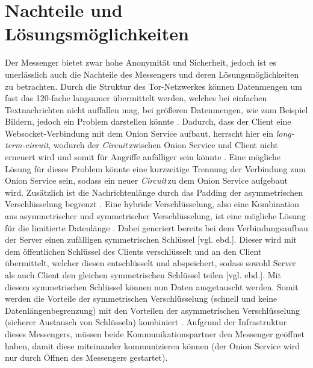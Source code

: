 \documentclass[a4paper,ngerman, headheight=28pt,12pt, footheight=27pt]{scrartcl}
\newcommand{\vcite}[1]{\cite[vgl.][]{#1}}
\newcommand{\vebd}{[vgl. ebd.]}
\newcommand{\circuit}{\textit{Circuit\,}}
\begin{document}
\section{Nachteile und Lösungsmöglichkeiten}
Der Messenger bietet zwar hohe Anonymität und Sicherheit, jedoch ist es unerlässlich auch die Nachteile des Messengers und deren Lösungsmöglichkeiten zu betrachten. Durch die Struktur des Tor-Netzwerkes können Datenmengen um fast das 120-fache langsamer übermittelt werden, welches bei einfachen Textnachrichten nicht auffallen mag, bei größeren Datenmengen, wie zum Beispiel Bildern, jedoch ein Problem darstellen könnte \vcite{TorPerformance}.
Dadurch, dass der Client eine Websocket-Verbindung mit dem Onion Service aufbaut, herrscht hier ein \textit{long-term-circuit}, wodurch der \circuit zwischen Onion Service und Client nicht erneuert wird und somit für Angriffe anfälliger sein könnte \vcite{FAQCircuitLifetime}. Eine mögliche Lösung für dieses Problem könnte eine kurzzeitige Trennung der Verbindung zum Onion Service sein, sodass ein neuer \circuit zu dem Onion Service aufgebaut wird.
Zusätzlich ist die Nachrichtenlänge durch das Padding der asymmetrischen Verschlüsselung begrenzt \vcite{OpensslRsaMaxLength}.
Eine hybride Verschlüsselung, also eine Kombination aus asymmetrischer und symmetrischer Verschlüsselung, ist eine mögliche Lösung für die limitierte Datenlänge \vcite{HybridEncryption}. Dabei generiert bereits bei dem Verbindungsaufbau der Server einen zufälligen symmetrischen Schlüssel \vebd. Dieser wird mit dem öffentlichen Schlüssel des Clients verschlüsselt und an den Client übermittelt, welcher diesen entschlüsselt und abspeichert, sodass sowohl Server als auch Client den gleichen symmetrischen Schlüssel teilen \vebd. Mit diesem symmetrischen Schlüssel können nun Daten ausgetauscht werden.
Somit werden die Vorteile der symmetrischen Verschlüsselung (schnell und keine Datenlängenbegrenzung) mit den Vorteilen der asymmetrischen Verschlüsselung (sicherer Austausch von Schlüsseln) kombiniert \vcite{HybridTechnopedia}. Aufgrund der Infrastruktur dieses Messengers, müssen beide Kommunikationspartner den Messenger geöffnet haben, damit diese miteinander kommunizieren können (der Onion Service wird nur durch Öffnen des Messengers gestartet).
\end{document}
